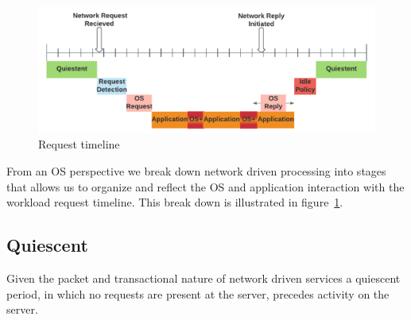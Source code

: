 
\begin{figure}
\centering
\includegraphics[width=1.1\columnwidth]{figures/timeline_chart}
\caption[]{Request timeline}
\label{fig:timeline}
\vspace{-0.25in}
\end{figure}


From an OS perspective we break down network driven processing into stages that allows us to organize and reflect the OS and application interaction with the workload request timeline.  This break down is illustrated in figure~\ref{fig:timeline}.   

\subsection{Quiescent}
\label{sec:workflow:Quiescent}
Given the packet and transactional nature of network driven services a quiescent period, in which no requests are present at the server, precedes activity on the server. 

